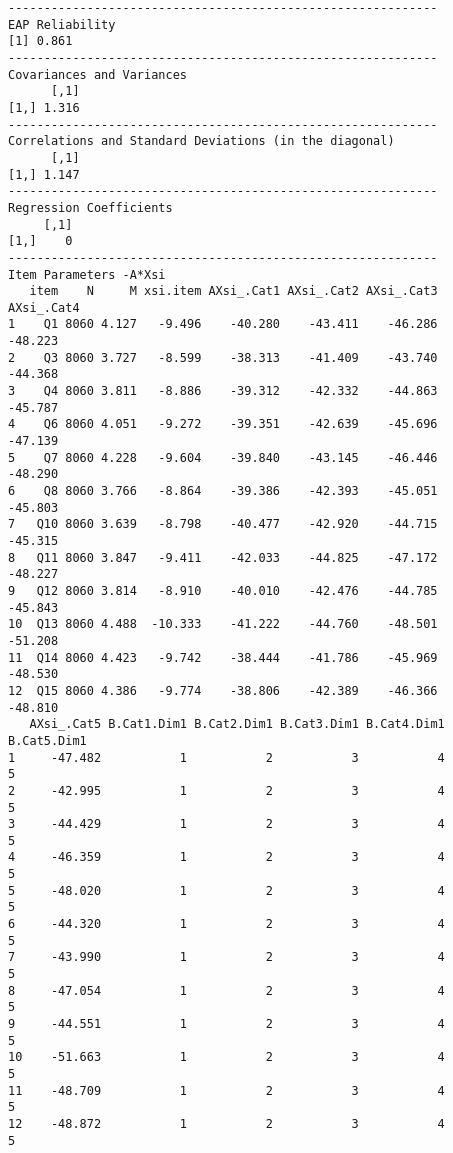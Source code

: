 \documentclass[
  letterpaper,
  DIV=11,
  numbers=noendperiod]{scrartcl}
\begin{document}
\begin{verbatim}
------------------------------------------------------------
EAP Reliability
[1] 0.861
------------------------------------------------------------
Covariances and Variances
      [,1]
[1,] 1.316
------------------------------------------------------------
Correlations and Standard Deviations (in the diagonal)
      [,1]
[1,] 1.147
------------------------------------------------------------
Regression Coefficients
     [,1]
[1,]    0
------------------------------------------------------------
Item Parameters -A*Xsi
   item    N     M xsi.item AXsi_.Cat1 AXsi_.Cat2 AXsi_.Cat3 AXsi_.Cat4
1    Q1 8060 4.127   -9.496    -40.280    -43.411    -46.286    -48.223
2    Q3 8060 3.727   -8.599    -38.313    -41.409    -43.740    -44.368
3    Q4 8060 3.811   -8.886    -39.312    -42.332    -44.863    -45.787
4    Q6 8060 4.051   -9.272    -39.351    -42.639    -45.696    -47.139
5    Q7 8060 4.228   -9.604    -39.840    -43.145    -46.446    -48.290
6    Q8 8060 3.766   -8.864    -39.386    -42.393    -45.051    -45.803
7   Q10 8060 3.639   -8.798    -40.477    -42.920    -44.715    -45.315
8   Q11 8060 3.847   -9.411    -42.033    -44.825    -47.172    -48.227
9   Q12 8060 3.814   -8.910    -40.010    -42.476    -44.785    -45.843
10  Q13 8060 4.488  -10.333    -41.222    -44.760    -48.501    -51.208
11  Q14 8060 4.423   -9.742    -38.444    -41.786    -45.969    -48.530
12  Q15 8060 4.386   -9.774    -38.806    -42.389    -46.366    -48.810
   AXsi_.Cat5 B.Cat1.Dim1 B.Cat2.Dim1 B.Cat3.Dim1 B.Cat4.Dim1 B.Cat5.Dim1
1     -47.482           1           2           3           4           5
2     -42.995           1           2           3           4           5
3     -44.429           1           2           3           4           5
4     -46.359           1           2           3           4           5
5     -48.020           1           2           3           4           5
6     -44.320           1           2           3           4           5
7     -43.990           1           2           3           4           5
8     -47.054           1           2           3           4           5
9     -44.551           1           2           3           4           5
10    -51.663           1           2           3           4           5
11    -48.709           1           2           3           4           5
12    -48.872           1           2           3           4           5


\end{verbatim}
\end{document}
